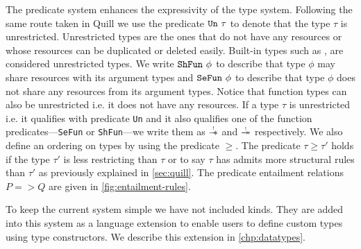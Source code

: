 The predicate system enhances the expressivity of the type system. Following the same route taken
in Quill \citep{morris_best_2016} we use the predicate $\texttt{Un}\ \tau$ to denote
that the type $\tau$ is unrestricted. Unrestricted types are the ones that do not have any resources or whose resources can
be duplicated or deleted easily. Built-in types such as ,  are considered unrestricted types.
We write $\texttt{ShFun}\ \phi$ to describe that type $\phi$ may share resources with its
argument types and  $\texttt{SeFun}\ \phi$ to describe that type $\phi$ does not share any resources from its argument types.
Notice that function types can also be unrestricted i.e. it does not have any resources. If a type $\tau$ is unrestricted i.e. it qualifies with predicate
\texttt{Un} and it also qualifies one of the function predicates---\texttt{SeFun} or \texttt{ShFun}---we write
them as $\tightoverset{\scalebox{0.5}{!}}{\sepimp}$ and $\tightoverset{\scalebox{0.5}{!}}{\shimp}$ respectively.
We also define an ordering on types by using the predicate $\geq$. The predicate $\tau \geq \tau'$ holds if the type $\tau'$
is less restricting than $\tau$ or to say $\tau$ has admits more structural rules than $\tau'$ as previously explained in \cref{sec:quill}.
The predicate entailment relations $P => Q$ are given in \cref{fig:entailment-rules}.

To keep the current system simple we have not included kinds. They are added into this system as a language extension
to enable users to define custom types using type constructors. We describe this extension in \cref{chp:datatypes}.

